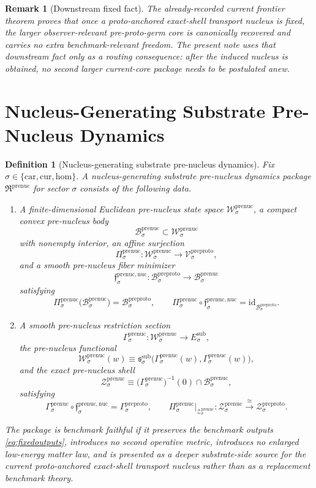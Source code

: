 \documentclass[11pt]{article}
\newcommand{\Car}{\mathrm{car}}
\newcommand{\Cur}{\mathrm{cur}}
\newcommand{\Hom}{\mathrm{hom}}
\newcommand{\SubTarget}[1]{E_{#1}^{\mathrm{sub}}}
\newcommand{\SubPair}[1]{\mathfrak s_{#1}^{\mathrm{sub}}}
\newcommand{\PreProtoSpace}[1]{\mathcal V_{#1}^{\mathrm{preproto}}}
\newcommand{\PreProtoBody}[1]{\mathcal B_{#1}^{\mathrm{preproto}}}
\newcommand{\PreProtoSection}[1]{\Gamma_{#1}^{\mathrm{preproto}}}
\newcommand{\PreProtoShellSet}[1]{\mathcal Z_{#1}^{\mathrm{preproto}}}
\newcommand{\PreNucPackage}{\mathfrak R^{\mathrm{prenuc}}}
\newcommand{\PreNucSpace}[1]{\mathcal W_{#1}^{\mathrm{prenuc}}}
\newcommand{\PreNucBody}[1]{\mathcal B_{#1}^{\mathrm{prenuc}}}
\newcommand{\PreNucProj}[1]{\Pi_{#1}^{\mathrm{prenuc}}}
\newcommand{\PreNucNucleusMin}[1]{\mathfrak f_{#1}^{\mathrm{prenuc,nuc}}}
\newcommand{\PreNucSection}[1]{\Gamma_{#1}^{\mathrm{prenuc}}}
\newcommand{\PreNucFunctional}[1]{\mathscr W_{#1}^{\mathrm{prenuc}}}
\newcommand{\PreNucShellSet}[1]{\mathcal Z_{#1}^{\mathrm{prenuc}}}
\newtheorem{definition}{Definition}
\newtheorem{remark}{Remark}
\begin{document}
\begin{remark}[Downstream fixed fact]
\label{rem:downstream}
The already-recorded current frontier theorem proves that once a proto-anchored exact-shell transport nucleus is fixed, the larger observer-relevant pre-proto-germ core is canonically recovered and carries no extra benchmark-relevant freedom. The present note uses that downstream fact only as a routing consequence: after the induced nucleus is obtained, no second larger current-core package needs to be postulated anew.
\end{remark}

\section{Nucleus-Generating Substrate Pre-Nucleus Dynamics}

\begin{definition}[Nucleus-generating substrate pre-nucleus dynamics]
\label{def:prenuc}
Fix \(\sigma\in\{\Car,\Cur,\Hom\}\). A nucleus-generating substrate pre-nucleus dynamics package \(\PreNucPackage\) for sector \(\sigma\) consists of the following data.
\begin{enumerate}
    \item A finite-dimensional Euclidean pre-nucleus state space \(\PreNucSpace{\sigma}\), a compact convex pre-nucleus body
    \[
    \PreNucBody{\sigma}\subset\PreNucSpace{\sigma}
    \]
    with nonempty interior, an affine surjection
    \[
    \PreNucProj{\sigma}:\PreNucSpace{\sigma}\to\PreProtoSpace{\sigma},
    \]
    and a smooth pre-nucleus fiber minimizer
    \[
    \PreNucNucleusMin{\sigma}:\PreProtoBody{\sigma}\to\PreNucBody{\sigma}
    \]
    satisfying
    \[
    \PreNucProj{\sigma}\bigl(\PreNucBody{\sigma}\bigr)=\PreProtoBody{\sigma},
    \qquad
    \PreNucProj{\sigma}\circ\PreNucNucleusMin{\sigma}
    =
    \mathrm{id}_{\PreProtoBody{\sigma}}.
    \]
    \item A smooth pre-nucleus restriction section
    \[
    \PreNucSection{\sigma}:\PreNucSpace{\sigma}\to\SubTarget{\sigma},
    \]
    the pre-nucleus functional
    \[
    \PreNucFunctional{\sigma}(w)
    \equiv
    \SubPair{\sigma}\bigl(\PreNucSection{\sigma}(w),\PreNucSection{\sigma}(w)\bigr),
    \]
    and the exact pre-nucleus shell
    \[
    \PreNucShellSet{\sigma}
    \equiv
    \bigl(\PreNucSection{\sigma}\bigr)^{-1}(0)\cap\PreNucBody{\sigma},
    \]
    satisfying
    \[
    \PreNucSection{\sigma}\circ\PreNucNucleusMin{\sigma}
    =
    \PreProtoSection{\sigma},
    \qquad
    \PreNucProj{\sigma}\big|_{\PreNucShellSet{\sigma}}
    :
    \PreNucShellSet{\sigma}
    \xrightarrow{\cong}
    \PreProtoShellSet{\sigma}.
    \]
\end{enumerate}
The package is \emph{benchmark faithful} if it preserves the benchmark outputs \eqref{eq:fixedoutputs}, introduces no second operative metric, introduces no enlarged low-energy matter law, and is presented as a deeper substrate-side source for the current proto-anchored exact-shell transport nucleus rather than as a replacement benchmark theory.
\end{definition}
\end{document}
